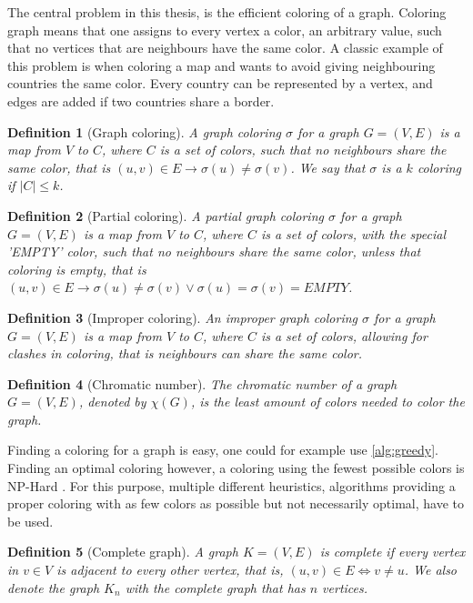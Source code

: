 \documentclass{amsart}
\newtheorem{definition}{Definition}[section]
\begin{document}
The central problem in this thesis, is the efficient coloring of a graph.
Coloring graph means that one assigns to every vertex a color, an arbitrary
value, such that no vertices that are neighbours have the same color. A classic
example of this problem is when coloring a map and wants to avoid giving
neighbouring countries the same color.  Every country can be represented by a
vertex, and edges are added if two countries share a border.

\begin{definition}[Graph coloring]
    A graph coloring $\sigma$ for a graph $G = (V,E)$ is a map from $V$ to $C$,
    where $C$ is a set of colors, such that no neighbours share the same color,
    that is $(u,v) \in E \to \sigma(u) \neq \sigma(v)$. We say that $\sigma$
    is a $k$ coloring if $|C| \leq k$.
\end{definition}
\begin{definition}[Partial coloring]
    A partial graph coloring $\sigma$ for a graph $G = (V,E)$ is a map from $V$ to $C$,
    where $C$ is a set of colors, with the special 'EMPTY' color, such that no
    neighbours share the same color, unless that coloring is empty, that is
    $(u,v) \in E \to \sigma(u) \neq \sigma(v) \vee \sigma(u) = \sigma(v) = EMPTY$. 
\end{definition}
\begin{definition}[Improper coloring]
    An improper graph coloring $\sigma$ for a graph $G = (V,E)$ is a map from
    $V$ to $C$, where $C$ is a set of colors, allowing for clashes in coloring,
    that is neighbours can share the same color.
\end{definition}
\begin{definition}[Chromatic number]
    The chromatic number of a graph $G = (V,E)$, denoted by $\chi(G)$,
    is the least amount of colors needed to color the graph.
\end{definition}

Finding a coloring for a graph is easy, one could for example use
\autoref{alg:greedy}. Finding an optimal coloring however, a coloring using the
fewest possible colors is NP-Hard \cite{NPHard}. For this purpose, multiple
different heuristics, algorithms providing a proper coloring with as few colors
as possible but not necessarily optimal, have to be used.

\begin{definition}[Complete graph]
    A graph $K = (V,E)$ is complete if every vertex in $v \in V$ is adjacent to
    every other vertex, that is, $ (u,v) \in E \iff v \neq u$. We also denote the graph $K_n$ with the complete graph that
    has $n$ vertices.
\end{definition}
\end{document}
